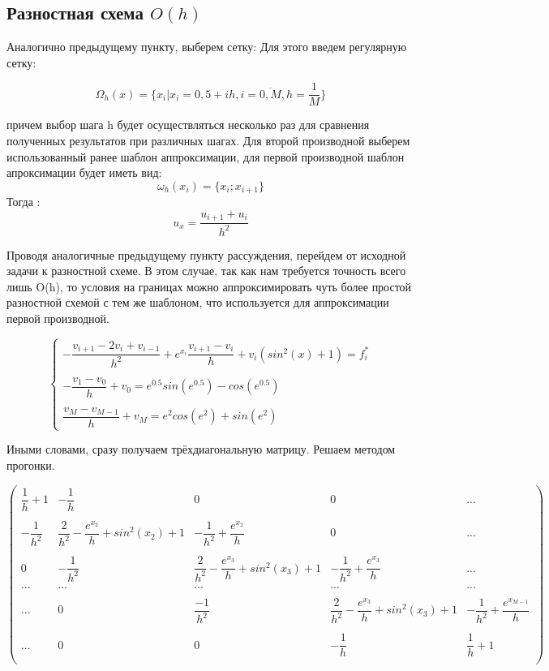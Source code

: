 \documentclass[12pt]{article}
\begin{document}
\subsection{Разностная схема $O(h)$}

Аналогично предыдущему пункту, выберем сетку:
Для этого введем регулярную сетку:

$$
\Omega_h(x) = \{x_i | x_i = 0,5 + ih, i = \overline{0, M}, h = \dfrac{1}{M}\}
$$

причем выбор шага h будет осуществляться несколько раз для сравнения полученных результатов при различных шагах.
Для второй производной выберем использованный ранее шаблон аппроксимации, для первой производной шаблон апроксимации будет иметь вид:
$$
\omega_h(x_i) = \{ x_{i}; x_{i + 1}\}
$$
Тогда :
$$
u_x = \dfrac{u_{i + 1} + u_{i}}{h^2}
$$

Проводя аналогичные предыдущему пункту рассуждения, перейдем от исходной задачи к разностной схеме. В этом случае, так как нам требуется точность всего лишь O(h), то условия на границах можно аппроксимировать чуть более простой разностной схемой с тем же шаблоном, что используется для аппроксимации первой производной.

$$
\begin{cases}
- \dfrac{v_{i+1} - 2v_i + v_{i - 1}}{h^2} + e^{x_i}\dfrac{v_{i+1} - v_i}{h} + v_i(sin^2(x) + 1) = f_i^* \\
\\
- \dfrac{v_1 - v_0}{h} + v_0 = e^{0.5}sin(e^{0.5}) - cos(e^{0.5}) \\
\\
\dfrac{v_M - v_{M-1}}{h} + v_M = e^2cos(e^2) + sin(e^2)
\end{cases}
$$


Иными словами, сразу получаем трёхдиагональную матрицу. Решаем методом прогонки.

$$
\begin{pmatrix}
	\dfrac{1}{h} + 1& -\dfrac{1}{h} &  0 & 0 & ... \\
	\\
	-\dfrac{1}{h^2}  & \dfrac{2}{h^2} - \dfrac{e^{x_2}}{h} + sin^2(x_2) + 1 & -\dfrac{1}{h^2} + \dfrac{e^{x_2}}{h} & 0 & ... \\
	\\
	0 & -\dfrac{1}{h^2} & \dfrac{2}{h^2} - \dfrac{e^{x_3}}{h} + sin^2(x_3) + 1 &
	 -\dfrac{1}{h^2} + \dfrac{e^{x_3}}{h} & ... \\
	... & ... & ... & ... & ... \\
	\\
	... & 0 & \dfrac{-1}{h^2} & \dfrac{2}{h^2} - \dfrac{e^{x_3}}{h} + sin^2(x_3) + 1 &
	 -\dfrac{1}{h^2} + \dfrac{e^{x_{M-1}}}{h} \\
	\\
	... & 0 & 0 & -\dfrac{1}{h} & \dfrac{1}{h} + 1\\
\end{pmatrix}
$$
\end{document}
